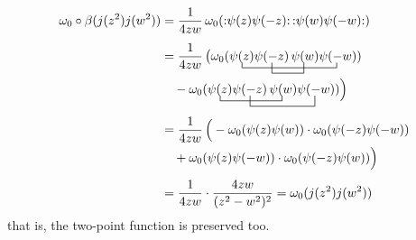 \begin{align*}
\vac\circ\beta(j(z^2)j(w^2))&=
\frac{1}{4zw}\,\vac(\wick{\psi(z)\psi(-z)}\,
\wick{\psi(w)\psi(-w)})\\[1ex]
&=\frac{1}{4zw}\,\big(\vac(
\bcontraction{}{\psi(z)}{\psi(-z)\psi(w)}{\psi(-w)}
\bcontraction[2ex]{\psi(z)}{\psi(-z)}{}{\psi(w)}
\psi(z)\psi(-z)\,\psi(w)\psi(-w))\\
&\quad-\vac(
\bcontraction{}{\psi(z)}{\psi(-z)}{\psi(w)}
\bcontraction[2ex]{\psi(z)}{\psi(-z)}{\psi(w)}{\psi(-w)}
\psi(z)\psi(-z)\,\psi(w)\psi(-w))\Big)\\[1ex]
&=\frac{1}{4zw}\,\Big(-\vac(\psi(z)\psi(w))\cdot 
\vac(\psi(-z)\psi(-w))\\
&\quad+\vac(\psi(z)\psi(-w))\cdot
\vac(\psi(-z)\psi(w))\Big)\\[1ex]
&=\frac{1}{4zw}\cdot\frac{4zw}{(z^2-w^2)^2}
=\vac(j(z^2)j(w^2))
\end{align*}
that is, the two-point function is preserved too.

